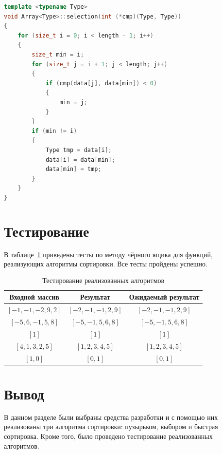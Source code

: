 \documentclass{report}
\begin{document}
\begin{lstlisting}[label=some-code,caption=Функция сортировки массива выбором,language=C++]
template <typename Type>
void Array<Type>::selection(int (*cmp)(Type, Type))
{
    for (size_t i = 0; i < length - 1; i++)
    {
        size_t min = i;
        for (size_t j = i + 1; j < length; j++)
        {
            if (cmp(data[j], data[min]) < 0)
            {
                min = j;
            }
        }
        if (min != i)
        {
            Type tmp = data[i];
            data[i] = data[min];
            data[min] = tmp;
        }
    }
}
\end{lstlisting}


\section{Тестирование}

В таблице~\ref{tbl:test} приведены тесты по методу чёрного ящика для функций, реализующих алгоритмы сортировки. Все тесты пройдены успешно.

\begin{table}[h!]
	\begin{center}
	\caption{\label{tbl:test}Тестирование реализованных алгоритмов}
		\begin{tabular}{|c|c|c|}
			\hline
			Входной массив & Результат & Ожидаемый результат \\ 
			\hline
			$[-1, -1, -2, 9, 2]$ & $[-2, -1, -1, 2, 9]$  & $[-2, -1, -1, 2, 9]$\\\hline
			$[-5, 6, -1, 5, 8]$  & $[-5, -1, 5, 6, 8]$  & $[-5, -1, 5, 6, 8]$\\\hline
			$[1]$  & $[1]$  & $[1]$\\\hline
			$[4, 1, 3, 2, 5]$  & $[1, 2, 3, 4, 5]$  & $[1, 2, 3, 4, 5]$\\\hline
			$[1, 0]$  & $[0, 1]$  & $[0, 1]$\\\hline
		\end{tabular}
	\end{center}
\end{table}

\section{Вывод}

В данном разделе были выбраны средства разработки и с помощью них реализованы три алгоритма сортировки: пузырьком, выбором и быстрая сортировка. Кроме того, было проведено тестирование реализованных алгоритмов.
\end{document}

